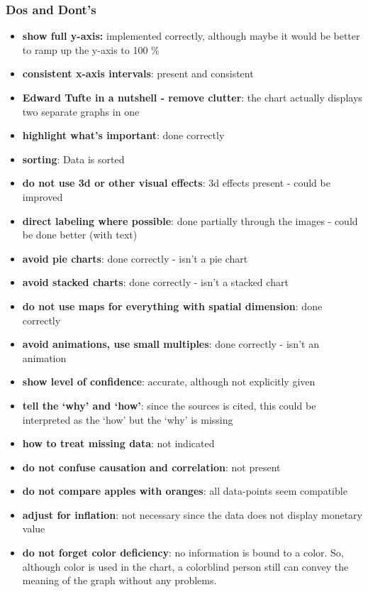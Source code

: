 \documentclass[a4paper]{article}
\begin{document}
    \subsubsection{Dos and Dont's}
    \begin{itemize}
        \item \textbf{show full y-axis:} implemented correctly, although maybe it would be better to ramp up the y-axis to 100 \%
        \item \textbf{consistent x-axis intervals}: present and consistent
        \item \textbf{Edward Tufte in a nutshell - remove clutter}: the chart actually displays two separate graphs in one
        \item \textbf{highlight what’s important}: done correctly
        \item \textbf{sorting}: Data is sorted
        \item \textbf{do not use 3d or other visual effects}: 3d effects present - could be improved
        \item \textbf{direct labeling where possible}: done partially through the images - could be done better (with text)
        \item \textbf{avoid pie charts}: done correctly - isn't a pie chart
        \item \textbf{avoid stacked charts}: done correctly - isn't a stacked chart
        \item \textbf{do not use maps for everything with spatial dimension}: done correctly
        \item \textbf{avoid animations, use small multiples}: done correctly - isn't an animation
        \item \textbf{show level of confidence}: accurate, although not explicitly given
        \item \textbf{tell the ‘why’ and ‘how’}: since the sources is cited, this could be interpreted as the ‘how’
        but the ‘why’ is missing
        \item \textbf{how to treat missing data}: not indicated
        \item \textbf{do not confuse causation and correlation}: not present
        \item \textbf{do not compare apples with oranges}: all data-points seem compatible
        \item \textbf{adjust for inflation}: not necessary since the data does not display monetary value
        \item \textbf{do not forget color deficiency}: no information is bound to a color.
        So, although color is used in the chart, a colorblind person still can convey the meaning of the graph without any problems.
    \end{itemize}
\end{document}
